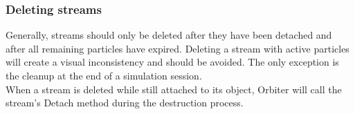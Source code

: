 \documentclass[Orbiter Developer Manual.tex]{subfiles}
\begin{document}
\subsubsection{Deleting streams}
Generally, streams should only be deleted after they have been detached and after all remaining particles have expired. Deleting a stream with active particles will create a visual inconsistency and should be avoided. The only exception is the cleanup at the end of a simulation session.\\
When a stream is deleted while still attached to its object, Orbiter will call the stream's Detach method during the destruction process.
\end{document}
